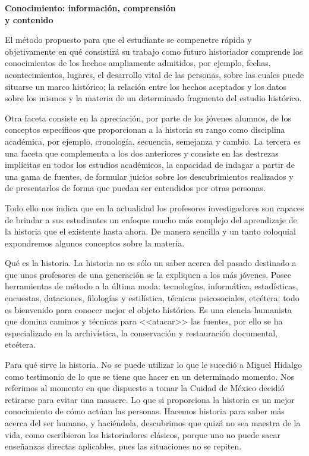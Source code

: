 \medskip
\textbf{Conocimiento: información, comprensión\\ y contenido}
 
El método propuesto para que el estudiante se compenetre rápida y 
objetivamente en qué consistirá su trabajo como futuro historiador 
comprende los conocimientos de los hechos ampliamente admitidos, por 
ejemplo, fechas, acontecimientos, lugares, el desarrollo vital de las 
personas, sobre las cuales puede situarse un marco histórico; la 
relación entre los hechos aceptados y los datos sobre los mismos y la 
materia de un determinado fragmento del estudio histórico.

 
Otra faceta consiste en la apreciación, por parte de los jóvenes 
alumnos, de los conceptos específicos que proporcionan a la historia su 
rango como disciplina académica, por ejemplo, cronología, secuencia, 
semejanza y cambio. La tercera es una faceta que complementa a los dos 
anteriores y consiste en las destrezas implícitas en todos los estudios 
académicos, la capacidad de indagar a partir de una gama de fuentes, de 
formular juicios sobre los descubrimientos realizados y de presentarlos 
de forma que puedan ser entendidos  por otras personas.

 
Todo ello nos indica que en la actualidad los profesores investigadores 
son capaces de brindar a sus estudiantes un enfoque mucho más complejo 
del aprendizaje de la historia que el existente hasta ahora. De manera 
sencilla y un tanto coloquial expondremos algunos conceptos sobre la 
materia.

 
Qué es la historia. La historia no es sólo un saber acerca del pasado 
destinado a que unos profesores de una generación se la expliquen a los 
más jóvenes. Posee herramientas de método a la última moda: 
tecnologías, informática, estadísticas, encuestas, dataciones, 
filologías y estilística, técnicas psicosociales, etcétera; todo es 
bienvenido para conocer mejor el objeto histórico. Es una ciencia 
humanista que domina caminos y técnicas para <<atacar>> las fuentes, por 
ello se ha especializado en la archivística, la conservación y 
restauración documental, etcétera.

 
Para qué sirve la historia.  No se puede utilizar lo que le sucedió a 
Miguel Hidalgo como testimonio de lo que se tiene que hacer en un 
determinado momento. Nos referimos al momento en que dispuesto a tomar 
la Cuidad de México decidió retirarse para evitar una masacre. Lo que 
si proporciona la historia es un mejor conocimiento de cómo actúan las 
personas. Hacemos historia para saber más acerca del ser humano, y 
haciéndola, descubrimos que quizá no sea maestra de la vida, como 
escribieron los historiadores clásicos, porque uno no puede sacar 
enseñanzas directas aplicables, pues las situaciones no se repiten. 

